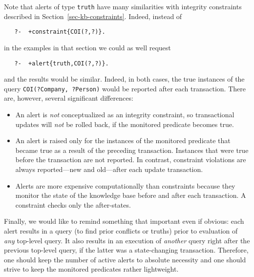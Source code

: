 Note that alerts of type \texttt{truth} have many similarities with
integrity constraints described in
Section~\ref{sec-kb-constraints}. Indeed, instead of
\begin{verbatim}
   ?-  +constraint{COI(?,?)}.
\end{verbatim}
in the examples in that section we could as well request
\begin{verbatim}
   ?-  +alert{truth,COI(?,?)}.
\end{verbatim}
and the results would be similar. Indeed, in both cases, the true instances of
the query \texttt{COI(?Company, ?Person)} would be reported after each
transaction. There are, however, several significant differences: 
\begin{itemize}
\item  An alert is \emph{not} conceptualized as an integrity constraint, so
  transactional updates will \emph{not} be rolled back, if the monitored
  predicate becomes true.
\item  An alert is raised only for the instances of the monitored
  predicate that became true as a result of the preceding transaction.
  Instances that were true before the transaction are not reported.
  In contrast, constraint violations are always reported---new and
  old---after each update transaction.
\item Alerts are more expensive computationally than constraints because
  they monitor the state of the knowledge base before and after each
  transaction. A constraint checks only the after-states.
\end{itemize}

Finally, we would like to remind something that important even if obvious:
each alert results in a query (to find prior conflicts or truths)
prior to evaluation of \emph{any}
top-level query. It also results in an execution of \emph{another} query
right after the previous top-level query, if the latter was a
state-changing transaction. Therefore, one should keep the number of active
alerts to absolute necessity and one should strive
to keep the monitored predicates rather lightweight.



